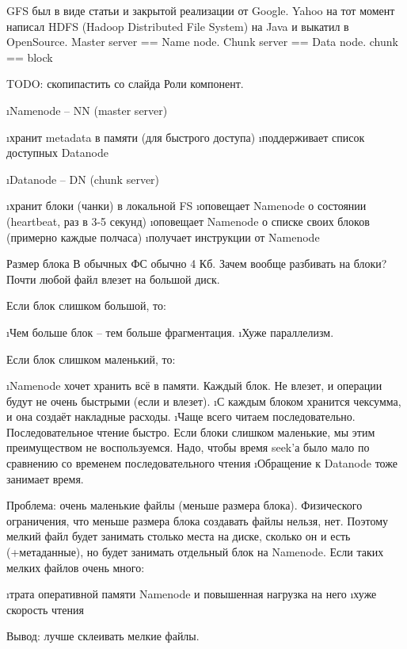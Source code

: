 GFS был в виде статьи и закрытой реализации от Google. Yahoo на тот момент написал HDFS (Hadoop Distributed File System) на Java и выкатил в OpenSource.
Master server == Name node. Chunk server == Data node. chunk == block

TODO: скопипастить со слайда Роли компонент.
\begin{itemize}
 \i Namenode -- NN (master server)
 \begin{itemize}
  \i хранит metadata в памяти (для быстрого доступа)
  \i поддерживает список доступных Datanode
 \end{itemize}
 \i Datanode -- DN (chunk server)
 \begin{itemize} 
  \i хранит блоки (чанки) в локальной FS
  \i оповещает Namenode о состоянии (heartbeat, раз в 3-5 секунд)
  \i оповещает Namenode о списке своих блоков (примерно каждые полчаса)
  \i получает инструкции от Namenode
 \end{itemize}
\end{itemize}

Размер блока
В обычных ФС обычно 4 Кб. 
Зачем вообще разбивать на блоки? Почти любой файл влезет на большой диск. 

Если блок слишком большой, то:
\begin{enumerate}
	\i Чем больше блок -- тем больше фрагментация.
	\i Хуже параллелизм.
\end{enumerate}
Если блок слишком маленький, то: 
\begin{enumerate}
	\i Namenode хочет хранить всё в памяти. Каждый блок. Не влезет, и операции будут не очень быстрыми (если и влезет). 
	\i С каждым блоком хранится чексумма, и она создаёт накладные расходы. 
	\i Чаще всего читаем последовательно. Последовательное чтение быстро. Если блоки слишком маленькие, мы этим преимуществом не воспользуемся. Надо, чтобы время seek'а было мало по сравнению со временем последовательного чтения
	\i Обращение к Datanode тоже занимает время. 
\end{enumerate}

Проблема: очень маленькие файлы (меньше размера блока).
Физического ограничения, что меньше размера блока создавать файлы нельзя, нет. Поэтому мелкий файл будет занимать столько места на диске, сколько он и есть (+метаданные), но будет занимать отдельный блок на Namenode. Если таких мелких файлов очень много:
\begin{enumerate}
	\i трата оперативной памяти Namenode и повышенная нагрузка на него
	\i хуже скорость чтения
\end{enumerate}
Вывод: лучше склеивать мелкие файлы.

